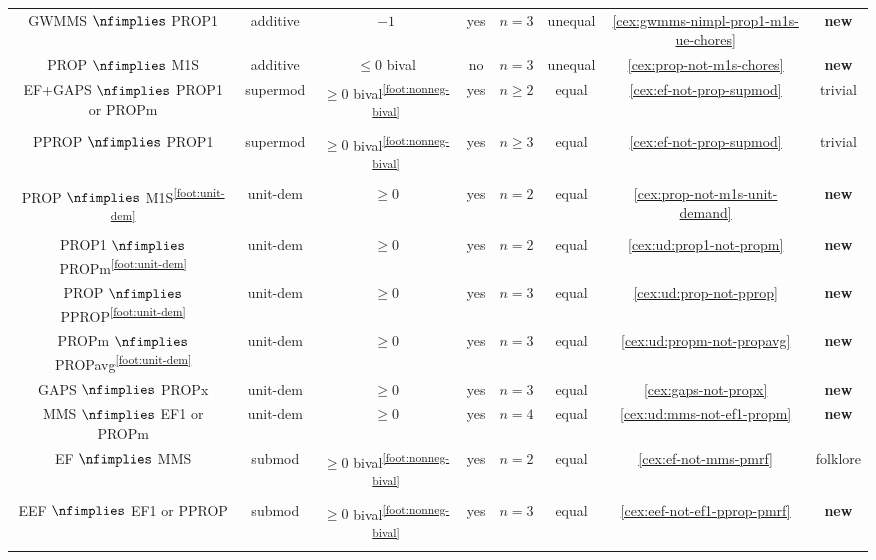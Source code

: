 \begin{table}[!htb]
\begin{tabular}{cccccccc}
\\[\defaultaddspace] GWMMS $\nfimplies$ PROP1
    & additive & $-1$ & yes & $n=3$ & unequal & \cref{cex:gwmms-nimpl-prop1-m1s-ue-chores} & \textbf{new}
\\[\defaultaddspace] PROP $\nfimplies$ M1S
    & additive & $\le 0$ bival & no & $n=3$ & unequal & \cref{cex:prop-not-m1s-chores} & \textbf{new}
%
\\\midrule \hfill\makecell[l]{EF+GAPS $\nfimplies$ \\ PROP1 or PROPm}\hfill
    & supermod & $\ge 0$ bival\textsuperscript{\ref{foot:nonneg-bival}}
    & yes & $n \ge 2$ & equal & \cref{cex:ef-not-prop-supmod} & trivial
\\[\defaultaddspace] PPROP $\nfimplies$ PROP1
    & supermod & $\ge 0$ bival\textsuperscript{\ref{foot:nonneg-bival}}
    & yes & $n \ge 3$ & equal & \cref{cex:ef-not-prop-supmod} & trivial
%
\\\midrule PROP $\nfimplies$ M1S\textsuperscript{\ref{foot:unit-dem}}
    & unit-dem & $\ge 0$ & yes & $n=2$ & equal
    & \cref{cex:prop-not-m1s-unit-demand} & \textbf{new}
\\[\defaultaddspace] PROP1 $\nfimplies$ PROPm\textsuperscript{\ref{foot:unit-dem}}
    & unit-dem & $\ge 0$ & yes & $n=2$ & equal
    & \cref{cex:ud:prop1-not-propm} & \textbf{new}
\\[\defaultaddspace] PROP $\nfimplies$ PPROP\textsuperscript{\ref{foot:unit-dem}}
    & unit-dem & $\ge 0$ & yes & $n=3$ & equal
    & \cref{cex:ud:prop-not-pprop} & \textbf{new}
\\[\defaultaddspace] PROPm $\nfimplies$ PROPavg\textsuperscript{\ref{foot:unit-dem}}
    & unit-dem & $\ge 0$ & yes & $n=3$ & equal
    & \cref{cex:ud:propm-not-propavg} & \textbf{new}
\\[\defaultaddspace] GAPS $\nfimplies$ PROPx
    & unit-dem & $\ge 0$ & yes & $n=3$ & equal & \cref{cex:gaps-not-propx} & \textbf{new}
\\[\defaultaddspace] MMS $\nfimplies$ EF1 or PROPm
    & unit-dem & $\ge 0$ & yes & $n=4$ & equal
    & \cref{cex:ud:mms-not-ef1-propm} & \textbf{new}
%
\\\midrule EF $\nfimplies$ MMS
    & submod & $\ge 0$ bival\textsuperscript{\ref{foot:nonneg-bival}}
    & yes & $n=2$ & equal & \cref{cex:ef-not-mms-pmrf} & folklore
\\[\defaultaddspace] EEF $\nfimplies$ EF1 or PPROP
    & submod & $\ge 0$ bival\textsuperscript{\ref{foot:nonneg-bival}}
    & yes & $n=3$ & equal & \cref{cex:eef-not-ef1-pprop-pmrf} & \textbf{new}

\end{tabular}
\end{table}
